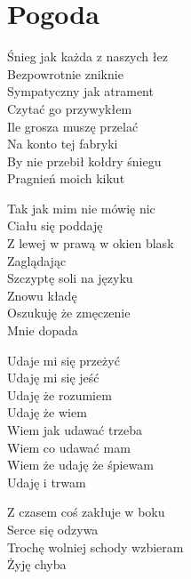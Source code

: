 \section{Pogoda}
\begin{text}
Śnieg jak każda z naszych łez\\
Bezpowrotnie zniknie\\
Sympatyczny jak atrament\\
Czytać go przywykłem\\
Ile grosza muszę przelać\\
Na konto tej fabryki\\
By nie przebił kołdry śniegu\\
Pragnień moich kikut

Tak jak mim nie mówię nic\\
Ciału się poddaję\\
Z lewej w prawą w okien blask\\
Zaglądając\\
Szczyptę soli na języku\\
Znowu kładę\\
Oszukuję że zmęczenie\\
Mnie dopada

Udaje mi się przeżyć\\
Udaję mi się jeść\\
Udaję że rozumiem\\
Udaję że wiem\\
Wiem jak udawać trzeba\\
Wiem co udawać mam\\
Wiem że udaję że śpiewam\\
Udaję i trwam

Z czasem coś zakłuje w boku\\
Serce się odzywa\\
Trochę wolniej schody wzbieram\\
Żyję chyba
\end{text}